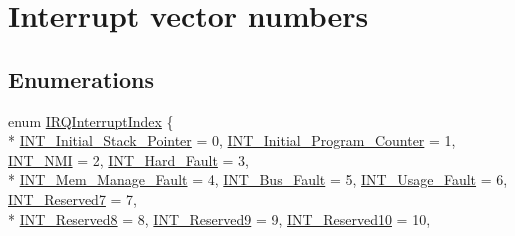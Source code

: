 \hypertarget{group___interrupt__vector__numbers}{}\section{Interrupt vector numbers}
\label{group___interrupt__vector__numbers}
\subsection*{Enumerations}
\begin{DoxyCompactItemize}
\item 
enum \hyperlink{group___interrupt__vector__numbers_ga5f3656e2a154b64aa378a2f3856c3a8d}{I\+R\+Q\+Interrupt\+Index} \{ \\*
\hyperlink{group___interrupt__vector__numbers_gga5f3656e2a154b64aa378a2f3856c3a8da92fc45ac2a27fa3b2da3494a629ae70d}{I\+N\+T\+\_\+\+Initial\+\_\+\+Stack\+\_\+\+Pointer} = 0, 
\hyperlink{group___interrupt__vector__numbers_gga5f3656e2a154b64aa378a2f3856c3a8da7171e28892d2c1f7d1bca288bf743d7f}{I\+N\+T\+\_\+\+Initial\+\_\+\+Program\+\_\+\+Counter} = 1, 
\hyperlink{group___interrupt__vector__numbers_gga5f3656e2a154b64aa378a2f3856c3a8da4e1635ebba2c23b8f6fde7521164ef08}{I\+N\+T\+\_\+\+N\+MI} = 2, 
\hyperlink{group___interrupt__vector__numbers_gga5f3656e2a154b64aa378a2f3856c3a8da18ac0316e85bb517d51e7008ba782354}{I\+N\+T\+\_\+\+Hard\+\_\+\+Fault} = 3, 
\\*
\hyperlink{group___interrupt__vector__numbers_gga5f3656e2a154b64aa378a2f3856c3a8da31162f6d7e4a5315ebf60004e4f32ac5}{I\+N\+T\+\_\+\+Mem\+\_\+\+Manage\+\_\+\+Fault} = 4, 
\hyperlink{group___interrupt__vector__numbers_gga5f3656e2a154b64aa378a2f3856c3a8da660325666cf3ee1715e40e6f58043d38}{I\+N\+T\+\_\+\+Bus\+\_\+\+Fault} = 5, 
\hyperlink{group___interrupt__vector__numbers_gga5f3656e2a154b64aa378a2f3856c3a8da0d9a9fe9cc8ea8d5831cb1c1e11b88a8}{I\+N\+T\+\_\+\+Usage\+\_\+\+Fault} = 6, 
\hyperlink{group___interrupt__vector__numbers_gga5f3656e2a154b64aa378a2f3856c3a8da82712c8d6787e5bcb52fcf624b37f3af}{I\+N\+T\+\_\+\+Reserved7} = 7, 
\\*
\hyperlink{group___interrupt__vector__numbers_gga5f3656e2a154b64aa378a2f3856c3a8dabdb61b834090bb5d66b2c4b2cae20afd}{I\+N\+T\+\_\+\+Reserved8} = 8, 
\hyperlink{group___interrupt__vector__numbers_gga5f3656e2a154b64aa378a2f3856c3a8da3ed02973df7310e008e8f440637ce6e4}{I\+N\+T\+\_\+\+Reserved9} = 9, 
\hyperlink{group___interrupt__vector__numbers_gga5f3656e2a154b64aa378a2f3856c3a8daef05953f9dc13f3f824aa27cf401b23a}{I\+N\+T\+\_\+\+Reserved10} = 10, 

\end{DoxyCompactItemize}
